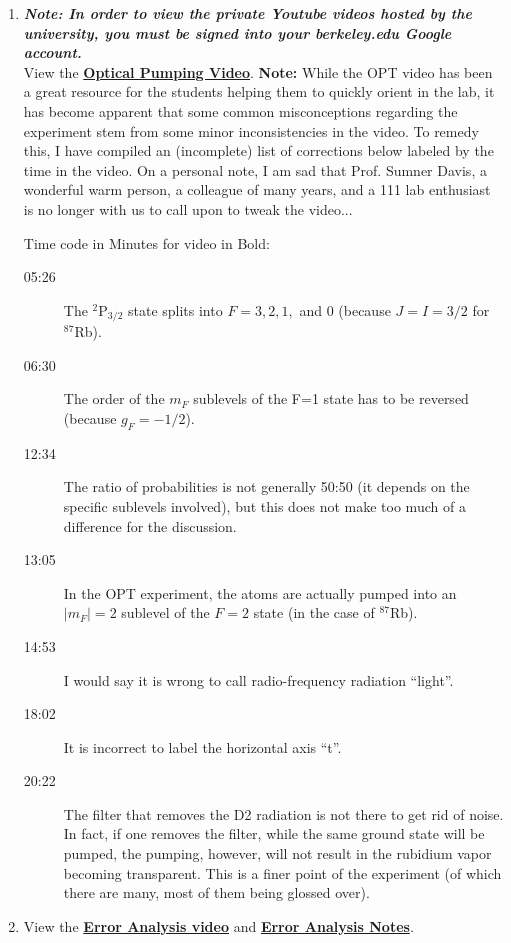 \documentclass{../lab}
\newcommand{\OpticalPumpingVideo}{https://www.youtube.com/watch?v=v4StxGAhm8Y}
\begin{document}
\begin{enumerate}
    \item \emph{\textbf{Note: In order to view the private Youtube videos hosted by the university, you must be signed into your berkeley.edu Google account.}}\\
    View the \href{\OpticalPumpingVideo}{\textbf{Optical Pumping Video}}.
    \textbf{Note:} While the OPT video has been a great resource for the students helping them to quickly orient in the lab, it has become apparent that some common misconceptions regarding the experiment stem from some minor inconsistencies in the video. To remedy this, I have compiled an (incomplete) list of corrections below labeled by the time in the video. On a personal note, I am sad that Prof. Sumner Davis, a wonderful warm person, a colleague of many years, and a 111 lab enthusiast is no longer with us to call upon to tweak the video...

    Time code in Minutes for video in Bold:

    \begin{description}
        \item [05:26] The $^2$P$_{3/2}$ state splits into $F = 3,2,1,$ and 0 (because $J = I = 3/2$ for $^{87}$Rb).

        \item [06:30] The order of the $m_F$ sublevels of the F=1 state has to be reversed (because $g_F = -1/2$).

        \item [12:34] The ratio of probabilities is not generally 50:50 (it depends on the specific sublevels involved), but this does not make too much of a difference for the discussion.

        \item [13:05] In the OPT experiment, the atoms are actually pumped into an $|m_F|=2$ sublevel of the $F = 2$ state (in the case of $^{87}$Rb).

        \item [14:53] I would say it is wrong to call radio-frequency radiation ``light''.

        \item [18:02] It is incorrect to label the horizontal axis ``t''.

        \item [20:22] The filter that removes the D2 radiation is not there to get rid of noise. In fact, if one removes the filter, while the same ground state will be pumped, the pumping, however, will not result in the rubidium vapor becoming transparent. This is a finer point of the experiment (of which there are many, most of them being glossed over).
    \end{description}

    \item View the \href{\ErrorAnalysisVideo}{\textbf{Error Analysis video}} and \href{\ErrorAnalysisNotes}{\textbf{Error Analysis Notes}}.
\end{enumerate}
\end{document}
